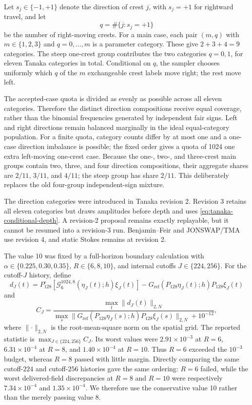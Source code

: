 \documentclass[10pt]{article}
\begin{document}
Let $s_j\in\{-1,+1\}$ denote the direction of crest $j$, with $s_j=+1$
for rightward travel, and let
\[
  q=\#\{j:s_j=+1\}
\]
be the number of right-moving crests.  For a main case, each pair $(m,q)$
with $m\in\{1,2,3\}$ and $q=0,\ldots,m$ is a parameter category.  These give
$2+3+4=9$ categories.  The steep one-crest group contributes the two
categories $q=0,1$, for eleven Tanaka categories in total.  Conditional on
$q$, the sampler chooses uniformly which $q$ of the $m$ exchangeable crest
labels move right; the rest move left.

The accepted-case quota is divided as evenly as possible across all eleven
categories.  Therefore the distinct direction compositions receive equal
coverage, rather than the binomial frequencies generated by independent fair
signs.  Left and right directions remain balanced marginally in the ideal
equal-category population.  For a finite quota, category counts differ by at
most one and a one-case direction imbalance is possible; the fixed order gives
a quota of 1024 one extra left-moving one-crest case.  Because the one-, two-,
and three-crest main groups contain two, three, and four direction
compositions, their aggregate shares are $2/11$, $3/11$, and $4/11$; the
steep group has share $2/11$.  This deliberately replaces the old four-group
independent-sign mixture.

The direction categories were introduced in Tanaka revision 2.  Revision 3
retains all eleven categories but draws amplitudes before depth and uses
\eqref{eq:tanaka-conditional-depth}.  A revision-2 proposal remains exactly
replayable, but it cannot be resumed into a revision-3 run.  Benjamin--Feir
and JONSWAP/TMA use revision 4, and static Stokes remains at revision 2.

The value 10 was fixed by a full-horizon boundary calculation with
$\alpha\in\{0.225,0.30,0.35\}$, $R\in\{6,8,10\}$, and internal cutoffs
$J\in\{224,256\}$.  For the cutoff-$J$ history, define
\[
  d_J(t)=P_{128}^{\circ}\!\left[
    \mathcal G_6^{1024,8}(\eta_J(t);h)\xi_J(t)
  \right]
  -G_{\mathrm{ref}}(P_{128}\eta_J(t);h)P_{128}\xi_J(t)
\]
and
\[
  C_J=
  \frac{\max_t\lVert d_J(t)\rVert_{2,N}}
       {\max_s\lVert
         G_{\mathrm{ref}}(P_{128}\eta_J(s);h)P_{128}\xi_J(s)
       \rVert_{2,N}+10^{-12}},
\]
where $\lVert\cdot\rVert_{2,N}$ is the root-mean-square norm on the spatial
grid.  The reported statistic is $\max_{J\in\{224,256\}}C_J$.  Its worst
values were $2.91\times10^{-3}$ at $R=6$, $6.31\times10^{-4}$ at $R=8$,
and $1.40\times10^{-4}$ at $R=10$.  Thus $R=6$ exceeded the $10^{-3}$ budget,
whereas $R=8$ passed with little margin.  Directly comparing the same
cutoff-$224$ and cutoff-$256$ histories gave the same ordering: $R=6$ failed,
while the worst delivered-field discrepancies at $R=8$ and $R=10$ were
respectively $7.34\times10^{-4}$ and $1.35\times10^{-4}$.  We therefore use
the conservative value 10 rather than the merely passing value 8.
\end{document}
